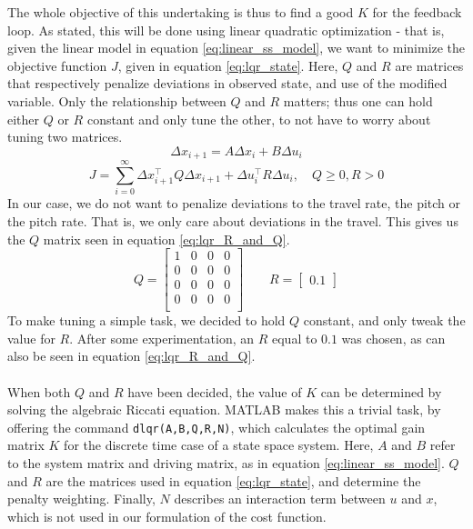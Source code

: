 The whole objective of this undertaking is thus to find a good $K$ for the feedback loop. As stated, this will be done using linear quadratic optimization - that is, given the linear model in equation \ref{eq:linear_ss_model}, we want to minimize the objective function $J$, given in equation \ref{eq:lqr_state}. Here, $Q$ and $R$ are matrices that respectively penalize deviations in observed state, and use of the modified variable. Only the relationship between $Q$ and $R$ matters; thus one can hold either $Q$ or $R$ constant and only tune the other, to not have to worry about tuning two matrices.
\begin{equation}\label{eq:linear_ss_model}
    \Delta x_{i+1} = A\Delta x_i + B\Delta u_i
\end{equation}
\begin{equation}\label{eq:lqr_state}
    J = \sum_{i = 0}^\infty \Delta x_{i+1}^\top Q \Delta x_{i+1} + \Delta u_i^\top R \Delta u_i,\quad Q\geq0, R > 0
\end{equation}
In our case, we do not want to penalize deviations to the travel rate,  the pitch or the pitch rate. That is, we only care about deviations in the travel. This gives us the $Q$ matrix seen in equation \ref{eq:lqr_R_and_Q}.
\begin{equation}\label{eq:lqr_R_and_Q}
    Q = \begin{bmatrix}
        1 & 0 & 0 & 0\\
        0 & 0 & 0 & 0\\
        0 & 0 & 0 & 0\\
        0 & 0 & 0 & 0\\
    \end{bmatrix}\qquad
    R = \begin{bmatrix}
        0.1
    \end{bmatrix}
\end{equation}
To make tuning a simple task, we decided to hold $Q$ constant, and only tweak the value for $R$. After some experimentation, an $R$ equal to $0.1$ was chosen, as can also be seen in equation \ref{eq:lqr_R_and_Q}.\\
\\
When both $Q$ and $R$ have been decided, the value of $K$ can be determined by solving the algebraic Riccati equation. MATLAB makes this a trivial task, by offering the command \lstinline!dlqr(A,B,Q,R,N)!, which calculates the optimal gain matrix $K$ for the discrete time case of a state space system. Here, $A$ and $B$ refer to the system matrix and driving matrix, as in equation \ref{eq:linear_ss_model}. $Q$ and $R$ are the matrices used in equation \ref{eq:lqr_state}, and determine the penalty weighting. Finally, $N$ describes an interaction term between $u$ and $x$, which is not used in our formulation of the cost function.\\
